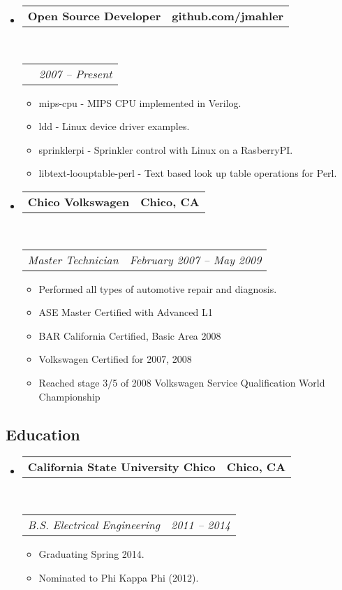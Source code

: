 \documentclass[11pt,letterpaper]{article}
\makeatletter
\newcommand{\headerrow}[2]
{\begin{tabular*}{\linewidth}{l@{\extracolsep{\fill}}r}
	#1 &
	#2 \\
\end{tabular*}}
\makeatother
\begin{document}
\begin{itemize}
	\parskip=0.1em

	\item
	\headerrow
		{\textbf{Open Source Developer}}
		{\textbf{github.com/jmahler}}
	\\
	\headerrow
		{\emph{}}
		{\emph{2007 -- Present}}
	\begin{itemize}
		\item mips-cpu - MIPS CPU implemented in Verilog.
		\item ldd - Linux device driver examples.
		\item sprinklerpi - Sprinkler control with Linux on a RasberryPI.
		\item libtext-loouptable-perl - Text based look up table operations for Perl.
	\end{itemize}

\end{itemize}



\begin{itemize}
	\parskip=0.1em

	\item
	\headerrow
		{\textbf{Chico Volkswagen}}
		{\textbf{Chico, CA}}
	\\
	\headerrow
		{\emph{Master Technician}}
		{\emph{February 2007 -- May 2009}}
	\begin{itemize}
		\item Performed all types of automotive repair and diagnosis.
		\item ASE Master Certified with Advanced L1
		\item BAR California Certified, Basic Area 2008
		\item Volkswagen Certified for 2007, 2008
		\item Reached stage 3/5 of 2008 Volkswagen Service Qualification World Championship
	\end{itemize}

\end{itemize}


\subsection*{Education}

\begin{itemize}
	\parskip=0.1em

	\item 
	\headerrow
		{\textbf{California State University Chico}}
		{\textbf{Chico, CA}}
	\\
	\headerrow
		{\emph{B.S. Electrical Engineering}}
		{\emph{2011 -- 2014}}
	\begin{itemize}
		\item Graduating Spring 2014.
		\item Nominated to Phi Kappa Phi (2012).
	\end{itemize}

\end{itemize}
\end{document}
